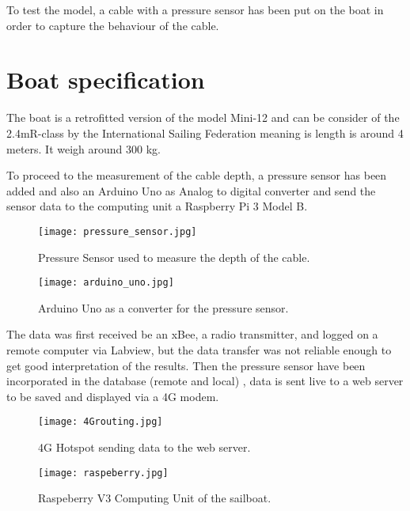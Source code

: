 To test the model, a cable with a pressure sensor has been put on the boat in order to capture the behaviour of the cable.



\section*{Boat specification}

The boat is a retrofitted version of the model Mini-12 and can be consider of the 2.4mR-class by the International Sailing Federation meaning is length is around 4 meters. It weigh around 300 kg.

To proceed to the measurement of the cable depth, a pressure sensor has been added and also an Arduino  Uno as  Analog to digital converter and send the sensor data to the computing unit a Raspberry Pi 3 Model B.

\begin{figure}[H]
\centering
    \begin{minipage}[b]{0.4\textwidth}
    \centering
    \texttt{[image: pressure\_sensor.jpg]}
    \caption{Pressure Sensor used to measure the depth of the cable.}
    \label{fig:pressure_sensor}
    \end{minipage}
    \hfill
    \begin{minipage}[b]{0.45\textwidth}
    \centering
    \texttt{[image: arduino\_uno.jpg]}
    \caption{Arduino Uno as a converter for the pressure sensor.}
    \label{fig:arduino_uno}
    \end{minipage}
\end{figure}

The data was first received be an xBee, a radio transmitter, and logged on a remote computer via Labview, but the data transfer was not reliable enough to get good interpretation of the results. Then the pressure sensor have been incorporated in the database (remote and local) , data is sent live to a web server to be saved and displayed via a 4G modem.

\begin{figure}[H]
\centering
    \begin{minipage}[b]{0.4\textwidth}
    \centering
    \texttt{[image: 4Grouting.jpg]}
    \caption{4G Hotspot sending data to the web server.}
    \label{fig:4grouting}
    \end{minipage}
    \hfill
    \begin{minipage}[b]{0.45\textwidth}
    \centering
    \texttt{[image: raspeberry.jpg]}
    \caption{Raspeberry V3 Computing Unit of the sailboat.}
    \label{fig:raspeberry}
    \end{minipage}
\end{figure}

